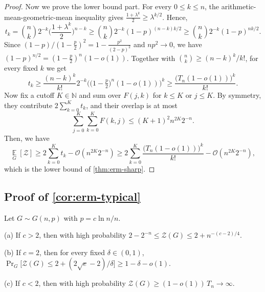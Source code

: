 \documentclass{article}
\theoremstyle{plain}
\theoremstyle{definition}
\theoremstyle{remark}
\begin{document}
\begin{proof}
Now we prove the lower bound part. For every $0 \leq k \leq n$, the arithmetic-mean-geometric-mean inequality gives $\frac{1+\lambda^k}{2}\ge\lambda^{k/2}$. Hence,
\begin{equation}
 t_k=\binom nk2^{-k}\Big(\frac{1+\lambda^k}{2}\Big)^{n-k} \geq \binom nk2^{-k}(1-p)^{(n-k)k/2}
 \geq \binom nk2^{-k}(1-p)^{nk/2}.
\end{equation}
Since $(1-p)/(1-\frac p2)^2=1-\frac{p^2}{(2-p)^2}$ and $np^2\to0$, we have $(1-p)^{n/2} = (1-\frac p2)^{n}(1-o(1))$. Together with $\binom nk\geq(n-k)^k/k!$, for every fixed $k$ we get
\begin{equation}
 t_k\geq \frac{(n-k)^k}{k!}2^{-k} \Big(\big(1-\tfrac p2\big)^{n}(1-o(1))\Big)^k \geq \frac{\big(T_n(1-o(1))\big)^k}{k!}.
\end{equation}
Now fix a cutoff $K\in\mathbb N$ and sum over $F(j,k)$ for $k\leq K$ or $j \leq K$. By symmetry, they contribute $2\sum\limits_{k=0}^Kt_k$, and their overlap is at most
\begin{equation}
\sum_{j=0}^K\sum_{k=0}^KF(k,j)\leq (K+1)^2n^{2K}2^{-n}.
\end{equation}
Then, we have
\begin{equation}
\operatorname*{\mathbb{E}}_G[\mathcal Z]\geq 2\sum_{k=0}^{K}t_k-\mathcal O(n^{2K}2^{-n})
\geq 2\sum_{k=0}^{K}\frac{\big(T_n(1-o(1))\big)^k}{k!}-\mathcal O(n^{2K}2^{-n}),
\end{equation}
which is the lower bound of \cref{thm:erm-sharp}.
\end{proof}


\subsection{Proof of \cref{cor:erm-typical}}
Let $G\sim G(n,p)$ with $p=c\ln n/n$.

\noindent\textup{(a)} If $c>2$, then with high probability $2-2^{-n}\le\mathcal Z(G)\le2+n^{-(c-2)/4}$.

\noindent\textup{(b)} If $c=2$, then for every fixed $\delta\in(0,1)$, $\Pr_G\big[\mathcal Z(G)\le2+(2\sqrt e-2)/\delta\big]\ge1-\delta-o(1)$.

\noindent\textup{(c)} If $c<2$, then with high probability $\mathcal Z(G)\ge(1-o(1))\,T_n\to\infty$.
\end{document}
